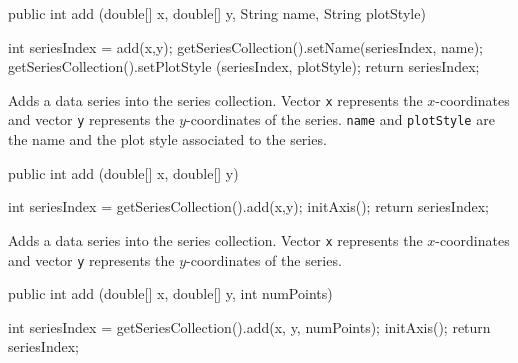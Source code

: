 \begin{code}

   public int add (double[] x, double[] y, String name, String plotStyle) \begin{hide} {
      int seriesIndex = add(x,y);
      getSeriesCollection().setName(seriesIndex, name);
      getSeriesCollection().setPlotStyle (seriesIndex, plotStyle);
      return seriesIndex;
   }\end{hide}
\end{code}
\begin{tabb}
   Adds a data series into the series collection. Vector \texttt{x} represents
   the $x$-coordinates and vector \texttt{y} represents the $y$-coordinates of
   the series. \texttt{name} and \texttt{plotStyle} are the name and the plot
   style associated to the series.
\end{tabb}
\begin{htmlonly}
\end{htmlonly}
\begin{code}

   public int add (double[] x, double[] y) \begin{hide} {
      int seriesIndex = getSeriesCollection().add(x,y);
      initAxis();
      return seriesIndex;
   }\end{hide}
\end{code}
\begin{tabb}
   Adds a data series into the series collection. Vector \texttt{x} represents
   the $x$-coordinates and vector \texttt{y} represents the $y$-coordinates of
   the series.
\end{tabb}
\begin{htmlonly}
\end{htmlonly}
\begin{code}

   public int add (double[] x, double[] y, int numPoints) \begin{hide} {
      int seriesIndex = getSeriesCollection().add(x, y, numPoints);
      initAxis();
      return seriesIndex;
   }\end{hide}
\end{code}
